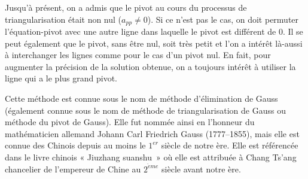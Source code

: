 Jusqu'à présent, on a admis que le pivot au cours du processus de triangularisation 
était non nul ($a_{pp} \neq 0$). Si ce n'est pas le cas, on doit permuter 
l'équation-pivot avec une autre ligne dans laquelle le pivot est différent de 0.
Il se peut également que le pivot, sans être nul, soit très petit et l'on a 
intérêt là-aussi à interchanger les lignes comme pour le cas d'un pivot nul.
En fait, pour augmenter la précision de la solution obtenue, on a toujours 
intérêt à utiliser la ligne qui a le plus grand pivot.

Cette méthode est connue sous le nom de méthode d'élimination 
de {\sc Gauss} (également connue sous
le nom de méthode de triangularisation de {\sc Gauss} ou méthode du pivot 
de {\sc Gauss}). Elle fut nommée ainsi en l'honneur du mathématicien allemand 
{\sc Johann Carl Friedrich Gauss} (1777--1855), mais elle est connue des Chinois 
depuis au moins le $1^{er}$ siècle de notre ère. Elle est référencée dans le livre 
chinois « Jiuzhang suanshu~» où elle est attribuée à {\sc Chang Ts'ang} chancelier de 
l'empereur de Chine au $2^{\grave eme}$ siècle avant notre ère. 


